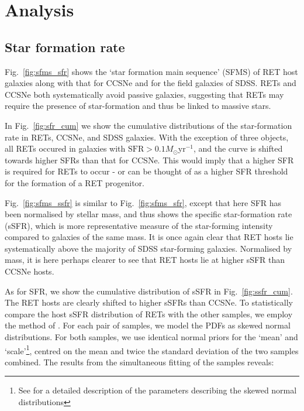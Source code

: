 \documentclass[fleqn,usenatbib,]{mnras}
\newcommand{\msun}[0]{M_{\odot}}
\begin{document}
\section{Analysis}
\label{sec:analysis} %

\subsection{Star formation rate \label{subsec:res_sfr}}
Fig.~\ref{fig:sfms_sfr} shows the `star formation main sequence' (SFMS) of RET host galaxies along with that for CCSNe and for the field galaxies of SDSS. RETs and CCSNe both systematically avoid passive galaxies, suggesting that RETs may require the presence of star-formation and thus be linked to massive stars.

In Fig.~\ref{fig:sfr_cum} we show the cumulative distributions of the star-formation rate in RETs, CCSNe, and SDSS galaxies. With the exception of three objects, all RETs occured in galaxies with $\textrm{SFR}>0.1 \msun$yr$^{-1}$, and the curve is shifted towards higher SFRs than that for CCSNe. This would imply that a higher SFR is required for RETs to occur - or can be thought of as a higher SFR threshold for the formation of a RET progenitor.

Fig.~\ref{fig:sfms_ssfr} is similar to Fig.~\ref{fig:sfms_sfr}, except that here SFR has been normalised by stellar mass, and thus shows the specific star-formation rate (sSFR), which is more representative measure of the star-forming intensity compared to galaxies of the same mass. It is once again clear that RET hosts lie systematically above the majority of SDSS star-forming galaxies. Normalised by mass, it is here perhaps clearer to see that RET hosts lie at higher sSFR than CCSNe hosts.

As for SFR, we show the cumulative distribution of sSFR in Fig.~\ref{fig:ssfr_cum}. The RET hosts are clearly shifted to higher sSFRs than CCSNe. To statistically compare the host sSFR distribution of RETs with the other samples, we employ the method of \citet{Wiseman2020}. For each pair of samples, we model the PDFs as skewed normal distributions. For both samples, we use identical normal priors for the `mean' and `scale'\footnote{See \citet{Wiseman2020} for a detailed description of the parameters describing the skewed normal distributions}, centred on the mean and twice the standard deviation of the two samples combined. The results from the simultaneous fitting of the samples reveals:
\end{document}
